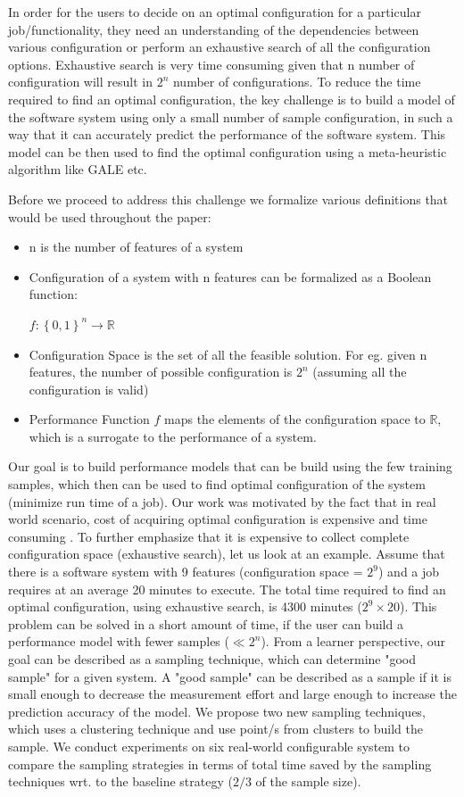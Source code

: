 \documentclass{sig-alternative}
\newcommand{\bi}{\begin{itemize}}%
\newcommand{\ei}{\end{itemize}}
\begin{document}
 In order for the users to decide on an optimal configuration for a particular job/functionality, they need an understanding of the dependencies between various configuration or perform an exhaustive search of all the configuration options. Exhaustive search is very time consuming given that n number of configuration will result in $2^n$ number of configurations. To reduce the time required to find an optimal configuration, the key challenge is to build a model of the software system using only a small number of sample configuration, in such a way that it can accurately predict the performance of the software system. This model can be then used to find the optimal configuration using a meta-heuristic algorithm like GALE etc. 
 
 Before we proceed to address this challenge we formalize various definitions that would be used throughout the paper:
 \bi
    \item{n is the number of features of a system}
    \item{Configuration of a system with n features can be 
    formalized as a Boolean function:\\
\begin{center}
    $ f: \left\{{0,1}\right\}^n \to \mathbb{R}$
\end{center}
    }
    
    \item{Configuration Space is the set of all the feasible solution. For eg. given n features, the number of possible configuration is $2^n$ (assuming all the configuration is valid) }
    \item{Performance Function $f$ maps the elements of the configuration space to $\mathbb{R}$, which is a surrogate to the performance of a system.   }
 \ei
 
Our goal is to build performance models that can be build using the few training samples, which then can be used to find optimal configuration of the system (minimize run time of a job). Our work was motivated by the fact that in real world scenario, cost of acquiring optimal configuration is expensive and time consuming \cite{weiss2008maximizing}. To further emphasize that it is expensive to collect complete configuration space (exhaustive search), let us look at an example. Assume that there is a software system with 9 features (configuration space = $2^9$) and a job requires at an average 20 minutes to execute. The total time required to find an optimal configuration, using exhaustive search, is 4300 minutes ($2^9 \times 20$). This problem can be solved in a short amount of time, if the user can build a performance model with fewer samples ($\ll 2^n$). From a learner perspective, our goal can be described as a sampling technique, which can determine "good sample" for a given system. A "good sample" can be described as a sample if it is small enough to decrease the measurement effort and large enough to increase the prediction accuracy of the model. We propose two new sampling techniques, which uses a clustering technique and use point/s from clusters to build the sample. We conduct experiments on six real-world configurable system to compare the sampling strategies in terms of total time saved by the sampling techniques wrt. to the baseline strategy ($2/3$ of the sample size).
\end{document}
